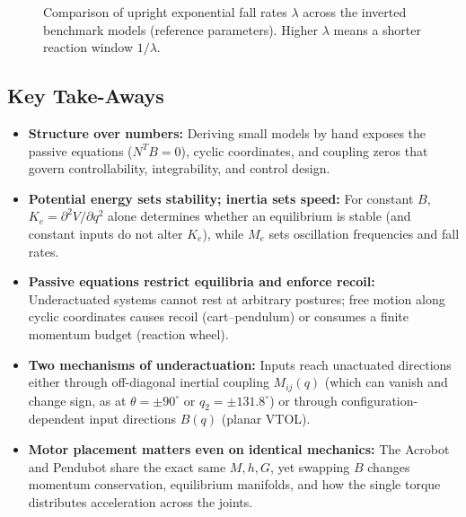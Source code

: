 \documentclass[11pt, a4paper]{article}
\theoremstyle{definition}
\theoremstyle{plain}
\begin{document}
\begin{figure}[ht]
\centering
{}
\caption{Comparison of upright exponential fall rates $\lambda$ across the inverted benchmark models (reference parameters). Higher $\lambda$ means a shorter reaction window $1/\lambda$.}
\label{fig:fall_rates}
\end{figure}

\subsection*{Key Take-Aways}
\begin{itemize}
  \item \textbf{Structure over numbers:} Deriving small models by hand exposes the passive equations ($N^T B = 0$), cyclic coordinates, and coupling zeros that govern controllability, integrability, and control design.
  \item \textbf{Potential energy sets stability; inertia sets speed:} For constant $B$, $K_e = \partial^2 V / \partial q^2$ alone determines whether an equilibrium is stable (and constant inputs do not alter $K_e$), while $M_e$ sets oscillation frequencies and fall rates.
  \item \textbf{Passive equations restrict equilibria and enforce recoil:} Underactuated systems cannot rest at arbitrary postures; free motion along cyclic coordinates causes recoil (cart--pendulum) or consumes a finite momentum budget (reaction wheel).
  \item \textbf{Two mechanisms of underactuation:} Inputs reach unactuated directions either through off-diagonal inertial coupling $M_{ij}(q)$ (which can vanish and change sign, as at $\theta = \pm 90^\circ$ or $q_2 = \pm 131.8^\circ$) or through configuration-dependent input directions $B(q)$ (planar VTOL).
  \item \textbf{Motor placement matters even on identical mechanics:} The Acrobot and Pendubot share the exact same $M, h, G$, yet swapping $B$ changes momentum conservation, equilibrium manifolds, and how the single torque distributes acceleration across the joints.
\end{itemize}
\end{document}
